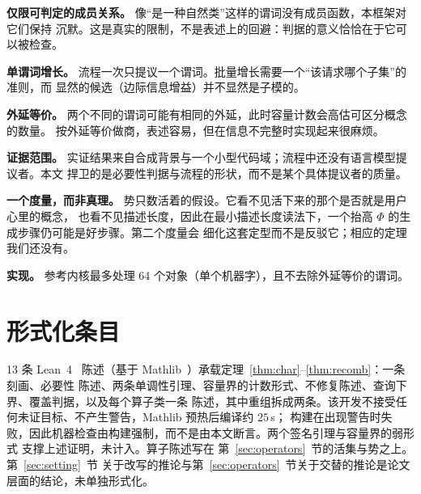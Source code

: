 \documentclass[11pt]{ctexart}
\begin{document}
\textbf{仅限可判定的成员关系。} 像“是一种自然类”这样的谓词没有成员函数，本框架对它们保持
沉默。这是真实的限制，不是表述上的回避：判据的意义恰恰在于它可以被检查。

\textbf{单谓词增长。} 流程一次只提议一个谓词。批量增长需要一个“该请求哪个子集”的准则，而
显然的候选（边际信息增益）并不显然是子模的。

\textbf{外延等价。} 两个不同的谓词可能有相同的外延，此时容量计数会高估可区分概念的数量。
按外延等价做商，表述容易，但在信息不完整时实现起来很麻烦。

\textbf{证据范围。} 实证结果来自合成背景与一个小型代码域；流程中还没有语言模型提议者。本文
捍卫的是必要性判据与流程的形状，而不是某个具体提议者的质量。

\textbf{一个度量，而非真理。} 势只数活着的假设。它看不见活下来的那个是否就是用户心里的概念，
也看不见描述长度，因此在最小描述长度读法下，一个抬高 $\Phi$ 的生成步骤仍可能是好步骤。第二个度量会
细化这套定型而不是反驳它；相应的定理我们还没有。

\textbf{实现。} 参考内核最多处理 64 个对象（单个机器字），且不去除外延等价的谓词。

\appendix

\section{形式化条目}

13 条 Lean~4~\cite{lean4} 陈述（基于 Mathlib~\cite{mathlib}）承载定理~\ref{thm:char}--\ref{thm:recomb}：一条刻画、必要性
陈述、两条单调性引理、容量界的计数形式、不修复陈述、查询下界、覆盖判据，以及每个算子类一条
陈述，其中重组拆成两条。该开发不接受任何未证目标、不产生警告，Mathlib 预热后编译约 $25$\,s；
构建在出现警告时失败，因此机器检查由构建强制，而不是由本文断言。两个签名引理与容量界的弱形式
支撑上述证明，未计入。算子陈述写在 第~\ref{sec:operators}~节的活集与势之上。第~\ref{sec:setting}~节
关于改写的推论与第~\ref{sec:operators}~节关于交替的推论是论文层面的结论，未单独形式化。
\end{document}
